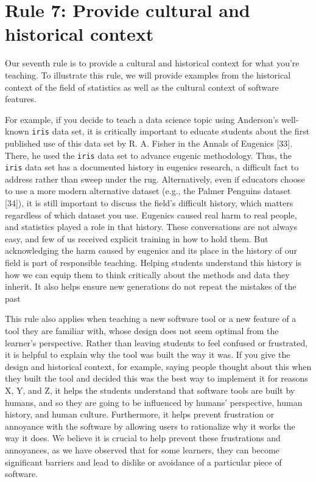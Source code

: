 \documentclass[
  10pt,
  letterpaper,
]{article}
\begin{document}
\section{Rule 7: Provide cultural and historical
context}\label{sec-rule7}

Our seventh rule is to provide a cultural and historical context for
what you're teaching. To illustrate this rule, we will provide examples
from the historical context of the field of statistics as well as the
cultural context of software features.

For example, if you decide to teach a data science topic using
Anderson's well-known \texttt{iris} data set, it is critically important
to educate students about the first published use of this data set by R.
A. Fisher in the Annals of Eugenics {[}33{]}. There, he used the
\texttt{iris} data set to advance eugenic methodology. Thus, the
\texttt{iris} data set has a documented history in eugenics research, a
difficult fact to address rather than sweep under the rug.
Alternatively, even if educators choose to use a more modern alternative
dataset (e.g., the Palmer Penguins dataset {[}34{]}), it is still
important to discuss the field's difficult history, which matters
regardless of which dataset you use. Eugenics caused real harm to real
people, and statistics played a role in that history. These
conversations are not always easy, and few of us received explicit
training in how to hold them. But acknowledging the harm caused by
eugenics and its place in the history of our field is part of
responsible teaching. Helping students understand this history is how we
can equip them to think critically about the methods and data they
inherit. It also helps ensure new generations do not repeat the mistakes
of the past

This rule also applies when teaching a new software tool or a new
feature of a tool they are familiar with, whose design does not seem
optimal from the learner's perspective. Rather than leaving students to
feel confused or frustrated, it is helpful to explain why the tool was
built the way it was. If you give the design and historical context, for
example, saying people thought about this when they built the tool and
decided this was the best way to implement it for reasons X, Y, and Z,
it helps the students understand that software tools are built by
humans, and so they are going to be influenced by humans' perspective,
human history, and human culture. Furthermore, it helps prevent
frustration or annoyance with the software by allowing users to
rationalize why it works the way it does. We believe it is crucial to
help prevent these frustrations and annoyances, as we have observed that
for some learners, they can become significant barriers and lead to
dislike or avoidance of a particular piece of software.
\end{document}
